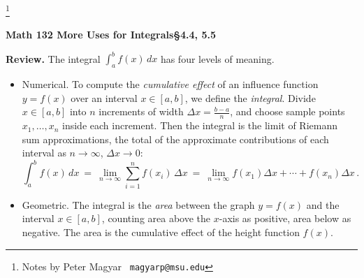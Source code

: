 \documentclass[11pt]{article}
\begin{document}
\footnote[0]{Notes by Peter Magyar \ {\tt magyarp@msu.edu}}
\vspace{-1em}

\centerline{\bf Math 132\hspace{1.5em} \hfill{\Large\bf More Uses for Integrals}\hfill \S4.4, 5.5}
\vspace{1em}

\noindent
{\bf Review.} 
The integral $\int_a^b f(x)\,dx$ has four levels of meaning.
\begin{itemize}
\item Numerical. 
To compute the {\it cumulative effect} of an influence function $y=f(x)$
over an interval $x\in [a,b]$, we define the {\it integral}.
Divide $x\in[a,b]$ into $n$ increments 
of width $\Delta x=\frac{b-a}{n}$, 
and choose sample points $x_1,\ldots, x_n$ inside each increment. 
Then the integral is the limit of Riemann sum approximations,
the total of the approximate contributions of each interval as $n\to\infty$, $\Delta x\to 0$:
$$
\int_a^b \!\!f(x) \,dx \ = \ 
\lim_{n\to\infty} \sum_{i=1}^n f(x_i)\, \Delta x
\ = \ 
\lim_{n\to\infty}
f(x_1)\Delta x +\cdots + f(x_n)\Delta x\,.
$$
\vspace{-1.3em}

\item Geometric. The integral is the {\it area} between the graph $y=f(x)$
and the interval $x\in[a,b]$, counting area above the $x$-axis as
positive, area below as negative.
The area  is the cumulative effect of the height function $f(x)$.


\end{itemize}
\end{document}
